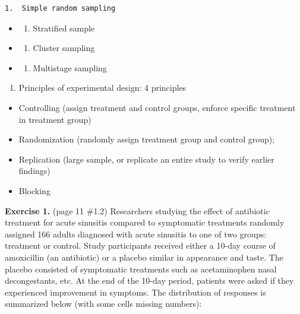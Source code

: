 \documentclass[
]{book}
\providecommand{\tightlist}{%
  \setlength{\itemsep}{0pt}\setlength{\parskip}{0pt}}
\begin{document}
\begin{itemize}
\begin{verbatim}
1.  Simple random sampling
\end{verbatim}

  \begin{itemize}
  \tightlist
  \item
    \begin{enumerate}
    \def\labelenumi{\arabic{enumi}.}
    \setcounter{enumi}{1}
    \tightlist
    \item
      Stratified sample
    \end{enumerate}
  \item
    \begin{enumerate}
    \def\labelenumi{\arabic{enumi}.}
    \setcounter{enumi}{2}
    \tightlist
    \item
      Cluster sampling
    \end{enumerate}
  \item
    \begin{enumerate}
    \def\labelenumi{\arabic{enumi}.}
    \setcounter{enumi}{3}
    \tightlist
    \item
      Multistage sampling
    \end{enumerate}
  \end{itemize}
\end{itemize}

\begin{enumerate}
\def\labelenumi{\arabic{enumi}.}
\setcounter{enumi}{3}
\tightlist
\item
  Principles of experimental design: 4 principles
\end{enumerate}

\begin{itemize}
\tightlist
\item
  Controlling (assign treatment and control groups, enforce specific treatment in treatment group)
\item
  Randomization (randomly assign treatment group and control group);
\item
  Replication (large sample, or replicate an entire study to verify earlier findings)
\item
  Blocking
\end{itemize}

\textbf{Exercise 1.} (page 11 \#1.2) Researchers studying the effect of antibiotic treatment for acute sinusitis compared to symptomatic treatments randomly assigned 166 adults diagnosed with acute sinusitis to one of two groups: treatment or control. Study participants received either a 10-day course of amoxicillin (an antibiotic) or a placebo similar in appearance and taste. The placebo consisted of symptomatic treatments such as acetaminophen nasal decongestants, etc. At the end of the 10-day period, patients were asked if they experienced improvement in symptoms. The distribution of responses is summarized below (with some cells missing numbers):
\end{document}
